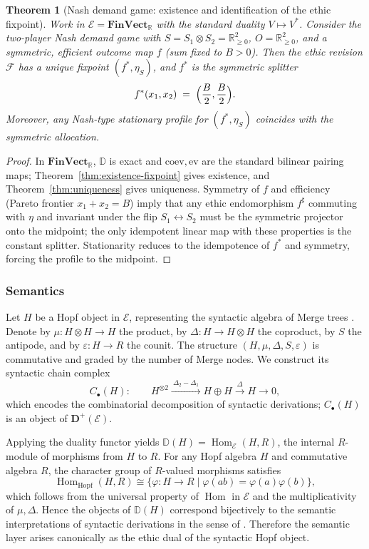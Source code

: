 \documentclass[12pt]{article}
\newcommand{\FinVect}{\mathbf{FinVect}}
\newcommand{\RR}{\mathbb{R}}
\newcommand{\E}{\mathcal{E}}
\newcommand{\DD}{\mathbb{D}}
\newcommand{\Hom}{\operatorname{Hom}}
\newcommand{\coev}{\mathrm{coev}}
\newcommand{\ev}{\mathrm{ev}}
\theoremstyle{plain}
\newtheorem{theorem}{Theorem}[section]
\theoremstyle{definition}
\theoremstyle{remark}
\numberwithin{equation}{section}
\begin{document}
\begin{theorem}[Nash demand game: existence and identification of the ethic fixpoint]
Work in $\E=\FinVect_{\RR}$ with the standard duality $V\mapsto V^*$. Consider the two-player Nash demand game with $S=S_1\otimes S_2=\RR_{\ge 0}^2$, $O=\RR_{\ge 0}^2$, and a symmetric, efficient outcome map $f$ (sum fixed to $B>0$). Then the ethic revision $\mathcal F$ has a unique fixpoint $(f^*,\eta_S)$, and $f^*$ is the symmetric splitter
\[
f^*(x_1,x_2) \;=\; \Bigl(\frac{B}{2},\frac{B}{2}\Bigr).
\]
Moreover, any Nash-type stationary profile for $(f^*,\eta_S)$ coincides with the symmetric allocation.
\end{theorem}

\begin{proof}
In $\FinVect_{\RR}$, $\DD$ is exact and $\coev,\ev$ are the standard bilinear pairing maps; Theorem~\ref{thm:existence-fixpoint} gives existence, and Theorem~\ref{thm:uniqueness} gives uniqueness. Symmetry of $f$ and efficiency (Pareto frontier $x_1+x_2=B$) imply that any ethic endomorphism $f^\sharp$ commuting with $\eta$ and invariant under the flip $S_1\leftrightarrow S_2$ must be the symmetric projector onto the midpoint; the only idempotent linear map with these properties is the constant splitter. Stationarity reduces to the idempotence of $f^*$ and symmetry, forcing the profile to the midpoint.
\end{proof}

\subsubsection{Semantics}\label{sec:ethic-semantics}

Let $H$ be a Hopf object in $\E$, representing the syntactic algebra of Merge trees \cite{MarcolliBerwickChomsky2023}. Denote by $\mu:H\otimes H\to H$ the product, by $\Delta:H\to H\otimes H$ the coproduct, by $S$ the antipode, and by $\varepsilon:H\to R$ the counit. The structure $(H,\mu,\Delta,S,\varepsilon)$ is commutative and graded by the number of Merge nodes. We construct its syntactic chain complex
\begin{equation}
C_\bullet(H):\qquad H^{\otimes 2}\xrightarrow{\ \Delta_2-\Delta_1\ } H\oplus H\xrightarrow{\ \Delta\ } H\to 0,
\end{equation}
which encodes the combinatorial decomposition of syntactic derivations; $C_\bullet(H)$ is an object of $\mathbf D^+(\E)$.

Applying the duality functor yields $\mathbb D(H)=\Hom_\E(H,R)$, the internal $R$-module of morphisms from $H$ to $R$. For any Hopf algebra $H$ and commutative algebra $R$, the character group of $R$-valued morphisms satisfies
\begin{equation}
\Hom_{\mathrm{Hopf}}(H,R)\cong \{\varphi:H\to R \mid \varphi(ab)=\varphi(a)\varphi(b)\},
\end{equation}
which follows from the universal property of $\Hom$ in $\E$ and the multiplicativity of $\mu,\Delta$. Hence the objects of $\mathbb D(H)$ correspond bijectively to the semantic interpretations of syntactic derivations in the sense of \cite{MarcolliBerwickChomsky2023}. Therefore the semantic layer arises canonically as the ethic dual of the syntactic Hopf object.
\end{document}
